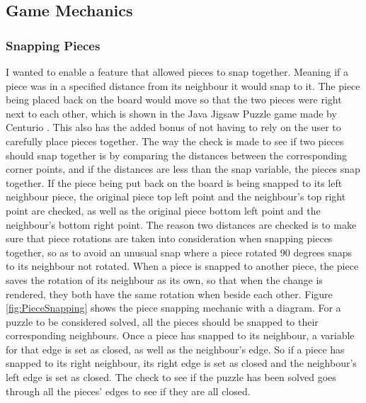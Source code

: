 \documentclass{article}
\begin{document}
\subsection{Game Mechanics}

\subsubsection{Snapping Pieces}
I wanted to enable a feature that allowed pieces to snap together. Meaning if a
piece was in a specified distance from its neighbour it would snap to it. The
piece being placed back on the board would move so that the two pieces were
right next to each other, which is shown in the Java Jigsaw Puzzle game made by
Centurio \cite{ref:SourceJigsaw}. This also has the added bonus of not having to
rely on the user to carefully place pieces together. The way the check is made
to see if two pieces should snap together is by comparing the distances between
the corresponding corner points, and if the distances are less than the snap
variable, the pieces snap together. If the piece being put back on the board is
being snapped to its left neighbour piece, the original piece top left point and
the neighbour's top right point are checked, as well as the original piece
bottom left point and the neighbour's bottom right point. The reason two
distances are checked is to make sure that piece rotations are taken into
consideration when snapping pieces together, so as to avoid an unusual snap
where a piece rotated 90 degrees snaps to its neighbour not rotated. When a
piece is snapped to another piece, the piece saves the rotation of its neighbour
as its own, so that when the change is rendered, they both have the same
rotation when beside each other. Figure \ref{fig:PieceSnapping} shows the piece
snapping mechanic with a diagram. For a puzzle to be considered solved, all the
pieces should be snapped to their corresponding neighbours. Once a piece has
snapped to its neighbour, a variable for that edge is set as closed, as well as
the neighbour's edge. So if a piece has snapped to its right neighbour, its
right edge is set as closed and the neighbour's left edge is set as closed. The
check to see if the puzzle has been solved goes through all the pieces' edges to
see if they are all closed.
\end{document}
